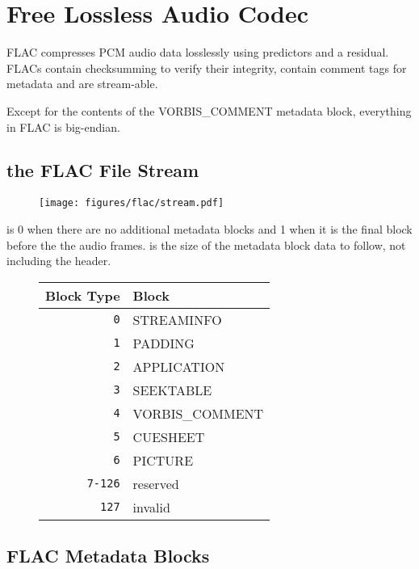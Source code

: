 
\chapter{Free Lossless Audio Codec}
FLAC compresses PCM audio data losslessly using predictors and a
residual.
FLACs contain checksumming to verify their integrity, contain comment tags for
metadata and are stream-able.

Except for the contents of the VORBIS\_COMMENT metadata block, everything in FLAC is big-endian.

\section{the FLAC File Stream}
\begin{figure}[h]
\texttt{[image: figures/flac/stream.pdf]}
\end{figure}
\par
\noindent
{} is 0 when there are no additional metadata blocks and 1 when
it is the final block before the the audio frames.
 is the size of the metadata block data to follow,
not including the header.
\begin{figure}[h]
\begin{tabular}{| r | l |}
\hline
Block Type & Block \\
\hline
\texttt{0} & STREAMINFO \\
\texttt{1} & PADDING \\
\texttt{2} & APPLICATION \\
\texttt{3} & SEEKTABLE \\
\texttt{4} & VORBIS\_COMMENT \\
\texttt{5} & CUESHEET \\
\texttt{6} & PICTURE \\
\texttt{7-126} & reserved \\
\texttt{127} & invalid \\
\hline
\end{tabular}
\end{figure}

\pagebreak

\section{FLAC Metadata Blocks}

